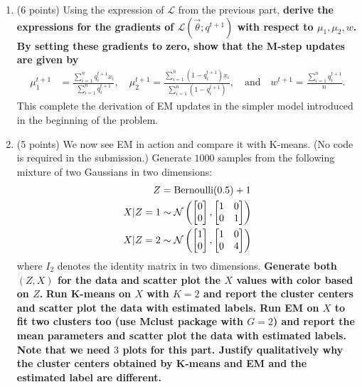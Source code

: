\documentclass[11pt]{article}
\begin{document}
\begin{enumerate}[label=(\alph*)]
\item (6 points) Using the expression of $\mathcal{L}$ from the previous
part, {\bf derive the expressions for the gradients of $\mathcal{L}
(\vec{\theta}; q^{t+1})$ with respect to $\mu_1, \mu_2, w$.
By setting these gradients to zero, show that the M-step updates are given
by}
\begin{align*}
  \mu_1^{t+1} &= \frac{\sum_{i=1}^n q_i^{t+1} x_i}{\sum_{i=1}^n q_i^{t+1}},\quad
  \mu_2^{t+1} = \frac{\sum_{i=1}^n (1-q_i^{t+1}) x_i}{\sum_{i=1}^n (1-q_i^
  {t+1})},\quad\text{and}\quad
  w^{t+1} = \frac{\sum_{i=1}^n q_i^{t+1}}{n}.
\end{align*}
This complete the derivation of EM updates in the simpler model introduced
in the beginning of the problem.

\item (5 points) We now see EM in action and compare it with K-means. (No
code is
required in the submission.)
Generate $1000$ samples from the following mixture of two Gaussians in two
dimensions:
\begin{align}
  Z &= \text{Bernoulli}(0.5) + 1 \notag\\
  X|Z=1 &\sim \mathcal{N}\left( \begin{bmatrix}0\\ 0\end{bmatrix}, \begin{bmatrix}1 & 0\\ 0 & 1\end{bmatrix}\right )\notag\\
  X|Z=2 &\sim \mathcal{N}\left( \begin{bmatrix}1\\ 0\end{bmatrix}, \begin{bmatrix}1 & 0\\ 0 & 4\end{bmatrix}\right )
  \label{eq:model_simulate}
\end{align}
where $I_2$ denotes the identity matrix in two dimensions.
\textbf{Generate both $(Z, X)$ for the data and scatter plot the $X$ values
with color based on $Z$.}
\textbf{Run K-means on $X$ with $K=2$ and report the cluster centers
and scatter plot the data with estimated labels.
Run EM on $X$ to fit two clusters too (use Mclust package with $G=2$)
and report the mean parameters
and scatter plot the data with estimated labels.
Note that we need $3$ plots for this part.
Justify qualitatively why the cluster centers obtained by K-means and
EM and the estimated label are different.}

\end{enumerate}
\end{document}
